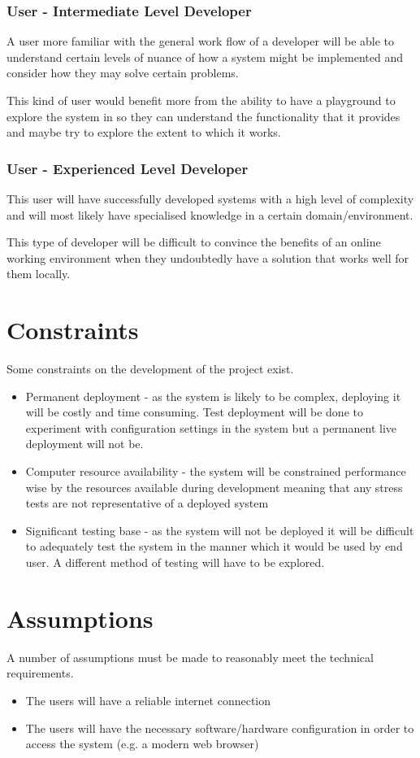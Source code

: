 \subsubsection{User - Intermediate Level Developer}
A user more familiar with the general work flow of a developer will be able to understand certain levels of nuance of how a system might be implemented and consider how they may solve certain problems.

This kind of user would benefit more from the ability to have a playground to explore the system in so they can understand the functionality that it provides and maybe try to explore the extent to which it works.

\subsubsection{User - Experienced Level Developer}
This user will have successfully developed systems with a high level of complexity and will most likely have specialised knowledge in a certain domain/environment.

This type of developer will be difficult to convince the benefits of an online working environment when they undoubtedly have a solution that works well for them locally.

\section{Constraints} \label{section:constraint}
Some constraints on the development of the project exist.

\begin{itemize}
    \item Permanent deployment - as the system is likely to be complex, deploying it will be costly and time consuming. Test deployment will be done to experiment with configuration settings in the system but a permanent live deployment will not be.
    \item Computer resource availability - the system will be constrained performance wise by the resources available during development meaning that any stress tests are not representative of a deployed system
    \item Significant testing base - as the system will not be deployed it will be difficult to adequately test the system in the manner which it would be used by end user. A different method of testing will have to be explored.
\end{itemize}

\section{Assumptions} \label{section:constraints}
A number of assumptions must be made to reasonably meet the technical requirements.

\begin{itemize}
    \item The users will have a reliable internet connection
    \item The users will have the necessary software/hardware configuration in order to access the system (e.g. a modern web browser)
\end{itemize}